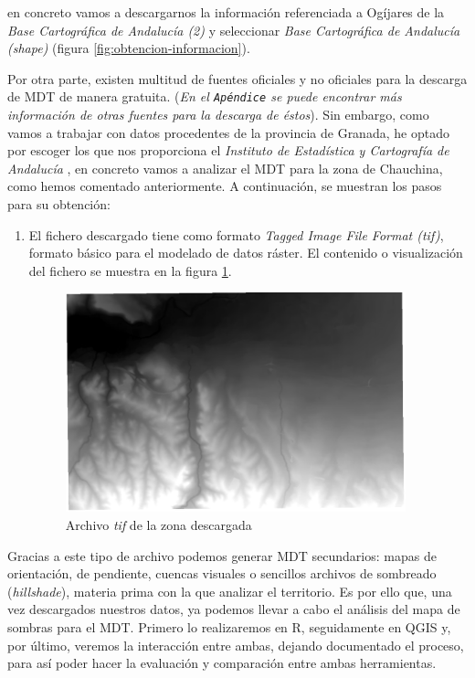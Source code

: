  en concreto vamos a descargarnos la información referenciada a Ogíjares de la \textit{Base Cartográfica de Andalucía (2)} y seleccionar \textit{Base Cartográfica de Andalucía (shape)} (figura \ref{fig:obtencion-informacion}).





\newpage




Por otra parte, existen multitud de fuentes oficiales y no oficiales para la descarga de MDT de manera gratuita. (\textit{En el \texttt{Apéndice} se puede encontrar más información de otras fuentes para la descarga de éstos}). Sin embargo, como vamos a trabajar con datos procedentes de la provincia de Granada, he optado por escoger los que nos proporciona el \textit{Instituto de Estadística y Cartografía de Andalucía} \cite{Instituto-Andalucia}, en concreto vamos a analizar el MDT para la zona de Chauchina, como hemos comentado anteriormente. A continuación, se muestran los pasos para su obtención:


\begin{enumerate}

	
	\item El fichero descargado tiene como formato \textit{Tagged Image File Format (tif)}, formato básico para el modelado de datos ráster. El contenido o visualización del fichero se muestra en la figura \ref{fig:tif}.
	
	\begin{figure}[H]
		\centering
		\includegraphics[height=6.35cm]{imagenes/capitulo2/4_Paso3-Obtencion.png}
		\caption{Archivo \textit{tif} de la zona descargada}
		\label{fig:tif}
	\end{figure}	
\end{enumerate}

Gracias a este tipo de archivo podemos generar MDT secundarios: mapas de orientación, de pendiente, cuencas visuales o sencillos archivos de sombreado (\textit{hillshade}), materia prima con la que analizar el territorio. Es por ello que, una vez descargados nuestros datos, ya podemos llevar a cabo el análisis del mapa de sombras para el MDT. Primero lo realizaremos en R, seguidamente en QGIS y, por último, veremos la interacción entre ambas, dejando documentado el proceso, para así poder hacer la evaluación y comparación entre ambas herramientas.





